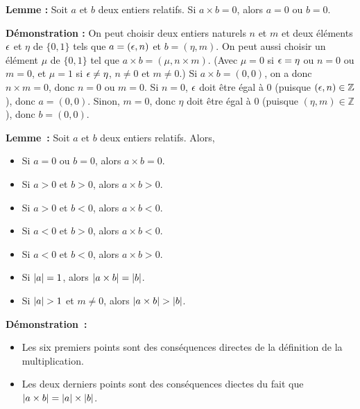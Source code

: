 \medskip

\noindent\textbf{Lemme :} Soit $a$ et $b$ deux entiers relatifs.
    Si $a \times b = 0$, alors $a = 0$ ou $b = 0$.

\medskip

\noindent\textbf{Démonstration :}  
    On peut choisir deux entiers naturels $n$ et $m$ et deux éléments $\epsilon$ et $\eta$ de $\lbrace 0, 1 \rbrace$ tels que $a = (\epsilon, n)$ et $b = (\eta, m)$. 
    On peut aussi choisir un élément $\mu$ de $\lbrace 0, 1 \rbrace$ tel que $a \times b = (\mu, n \times m)$.
    (Avec $\mu = 0$ si $\epsilon = \eta$ ou $n = 0$ ou $m = 0$, et $\mu = 1$ si $\epsilon \neq \eta$, $n \neq 0$ et $m \neq 0$.)
    Si $a \times b = (0,0)$, on a donc $n \times m = 0$, donc $n = 0$ ou $m = 0$.
    Si $n = 0$, $\epsilon$ doit être égal à $0$ (puisque $(\epsilon,n) \in \mathbb{Z}$), donc $a = (0,0)$.
    Sinon, $m = 0$, donc $\eta$ doit être égal à $0$ (puisque $(\eta,m) \in \mathbb{Z}$), donc $b = (0,0)$.

   \done 

\medskip

\noindent\textbf{Lemme :} Soit $a$ et $b$ deux entiers relatifs. 
    Alors, 
    \begin{itemize}[nosep]
        \item Si $a = 0$ ou $b = 0$, alors $a \times b = 0$.
        \item Si $a > 0$ et $b > 0$, alors $a \times b > 0$.
        \item Si $a > 0$ et $b < 0$, alors $a \times b < 0$.
        \item Si $a < 0$ et $b > 0$, alors $a \times b < 0$.
        \item Si $a < 0$ et $b < 0$, alors $a \times b > 0$.
        \item Si $\left\lvert a \right\rvert = 1$, alors $\left\lvert a \times b \right\rvert = \left\lvert b \right\rvert$.
        \item Si $\left\lvert a \right\rvert > 1$ et $m \neq 0$, alors $\left\lvert a \times b \right\rvert > \left\lvert b \right\rvert$.
    \end{itemize}

\medskip

\noindent\textbf{Démonstration :}

    \begin{itemize}[nosep]
        \item Les six premiers points sont des conséquences directes de la définition de la multiplication.
        \item Les deux derniers points sont des conséquences diectes du fait que $\left\lvert a \times b \right\rvert = \left\lvert a \right\rvert \times \left\lvert b \right\rvert$.
    \end{itemize}
    
